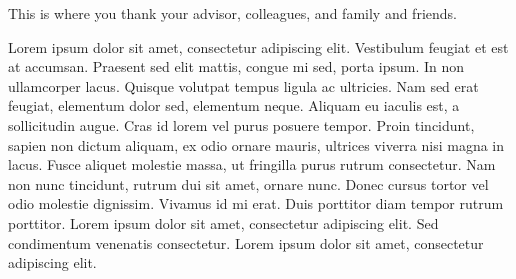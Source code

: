 
This is where you thank your advisor, colleagues, and family and friends.

Lorem ipsum dolor sit amet, consectetur adipiscing elit. Vestibulum feugiat et est at accumsan. Praesent sed elit mattis, congue mi sed, porta ipsum. In non ullamcorper lacus. Quisque volutpat tempus ligula ac ultricies. Nam sed erat feugiat, elementum dolor sed, elementum neque. Aliquam eu iaculis est, a sollicitudin augue. Cras id lorem vel purus posuere tempor. Proin tincidunt, sapien non dictum aliquam, ex odio ornare mauris, ultrices viverra nisi magna in lacus. Fusce aliquet molestie massa, ut fringilla purus rutrum consectetur. Nam non nunc tincidunt, rutrum dui sit amet, ornare nunc. Donec cursus tortor vel odio molestie dignissim. Vivamus id mi erat. Duis porttitor diam tempor rutrum porttitor. Lorem ipsum dolor sit amet, consectetur adipiscing elit. Sed condimentum venenatis consectetur. Lorem ipsum dolor sit amet, consectetur adipiscing elit.
